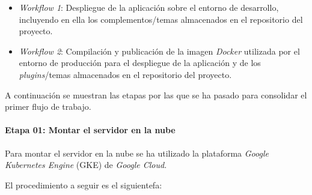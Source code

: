 \documentclass[
]{article}
\providecommand{\tightlist}{%
  \setlength{\itemsep}{0pt}\setlength{\parskip}{0pt}}
\begin{document}
\begin{itemize}
\tightlist
\item
  \emph{Workflow 1}: Despliegue de la aplicación sobre el entorno de
  desarrollo, incluyendo en ella los complementos/temas almacenados en
  el repositorio del proyecto.
\item
  \emph{Workflow 2}: Compilación y publicación de la imagen
  \emph{Docker} utilizada por el entorno de producción para el
  despliegue de la aplicación y de los \emph{plugins}/temas almacenados
  en el repositorio del proyecto.
\end{itemize}

A continuación se muestran las etapas por las que se ha pasado para
consolidar el primer flujo de trabajo.

\hypertarget{etapa-01-montar-el-servidor-en-la-nube}{%
\paragraph{Etapa 01: Montar el servidor en la
nube}\label{etapa-01-montar-el-servidor-en-la-nube}}

Para montar el servidor en la nube se ha utilizado la plataforma
\emph{Google Kubernetes Engine} (GKE) de \emph{Google Cloud}.

El procedimiento a seguir es el siguientefa:
\end{document}
